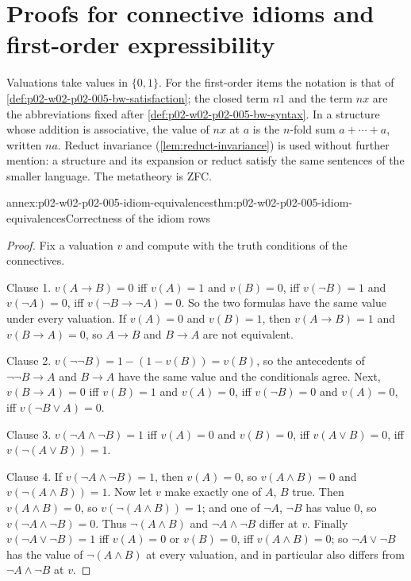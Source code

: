 \section{Proofs for connective idioms and first-order expressibility}
\label{sec:annex-p02-w02-p02-005-idioms}

Valuations take values in \(\{0,1\}\).  For the first-order items the
notation is that of \cref{def:p02-w02-p02-005-bw-satisfaction}; the closed
term \(n1\) and the term \(nx\) are the abbreviations fixed after
\cref{def:p02-w02-p02-005-bw-syntax}.  In a structure whose addition is
associative, the value of \(nx\) at \(a\) is the \(n\)-fold sum
\(a+\cdots+a\), written \(na\).  Reduct invariance
(\cref{lem:reduct-invariance}) is used without further mention: a
structure and its expansion or reduct satisfy the same sentences of the
smaller language.  The metatheory is ZFC.

\begin{annexitem}{annex:p02-w02-p02-005-idiom-equivalences}{thm:p02-w02-p02-005-idiom-equivalences}{Correctness of the idiom rows}
\begin{proof}
Fix a valuation \(v\) and compute with the truth conditions of the
connectives.

Clause 1.  \(v(A\to B)=0\) iff \(v(A)=1\) and \(v(B)=0\), iff
\(v(\neg B)=1\) and \(v(\neg A)=0\), iff \(v(\neg B\to\neg A)=0\).  So the
two formulas have the same value under every valuation.  If \(v(A)=0\) and
\(v(B)=1\), then \(v(A\to B)=1\) and \(v(B\to A)=0\), so \(A\to B\) and
\(B\to A\) are not equivalent.

Clause 2.  \(v(\neg\neg B)=1-(1-v(B))=v(B)\), so the antecedents of
\(\neg\neg B\to A\) and \(B\to A\) have the same value and the conditionals
agree.  Next, \(v(B\to A)=0\) iff \(v(B)=1\) and \(v(A)=0\), iff
\(v(\neg B)=0\) and \(v(A)=0\), iff \(v(\neg B\lor A)=0\).

Clause 3.  \(v(\neg A\land\neg B)=1\) iff \(v(A)=0\) and \(v(B)=0\), iff
\(v(A\lor B)=0\), iff \(v(\neg(A\lor B))=1\).

Clause 4.  If \(v(\neg A\land\neg B)=1\), then \(v(A)=0\), so
\(v(A\land B)=0\) and \(v(\neg(A\land B))=1\).  Now let \(v\) make exactly
one of \(A\), \(B\) true.  Then \(v(A\land B)=0\), so
\(v(\neg(A\land B))=1\); and one of \(\neg A\), \(\neg B\) has value \(0\),
so \(v(\neg A\land\neg B)=0\).  Thus \(\neg(A\land B)\) and
\(\neg A\land\neg B\) differ at \(v\).  Finally \(v(\neg A\lor\neg B)=1\)
iff \(v(A)=0\) or \(v(B)=0\), iff \(v(A\land B)=0\); so
\(\neg A\lor\neg B\) has the value of \(\neg(A\land B)\) at every
valuation, and in particular also differs from \(\neg A\land\neg B\) at
\(v\).
\end{proof}
\end{annexitem}

